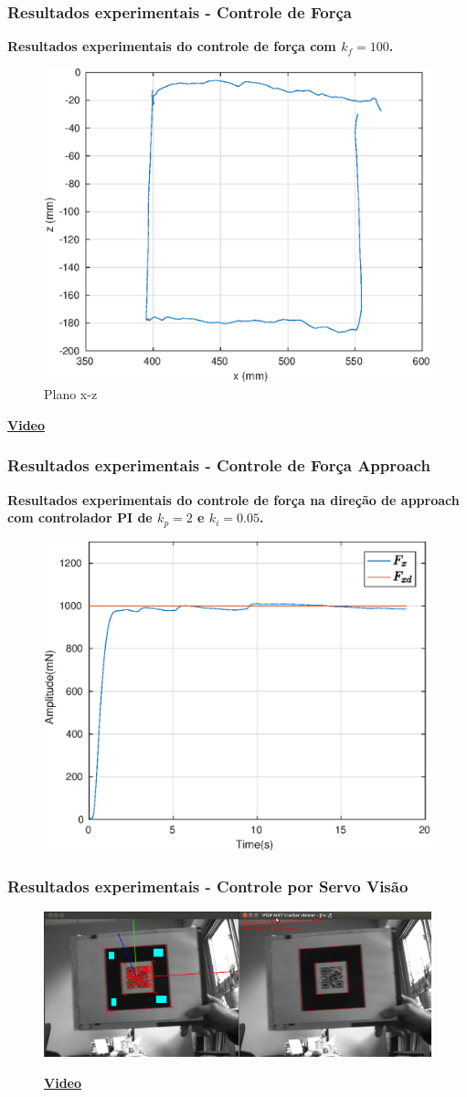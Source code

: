 \documentclass{beamer}
\begin{document}
\begin{frame}
\frametitle{Resultados experimentais - Controle de Força}
\textbf{Resultados experimentais do controle de força com $k_f = 100$.}
\begin{figure}[H]
\includegraphics[width=0.5\linewidth]{./img/float2/xz.eps}
\caption{Plano x-z}
\end{figure}%
\begin{center}
\href{run:./videos/force.mp4}{\textbf{Video}}%
\end{center}
\end{frame}

\begin{frame}
\frametitle{Resultados experimentais - Controle de Força Approach}
\textbf{Resultados experimentais do controle de força na direção de approach com controlador PI de $k_p = 2$ e $k_i = 0.05$. }
\begin{figure}[H]
\includegraphics[width=0.5\linewidth]{./img/force1000_kp2_ki005/Fx.eps}
\end{figure}%
\begin{center}
\end{center}
\end{frame}

\begin{frame}
\frametitle{Resultados experimentais - Controle por Servo Visão}
\begin{figure}[H]
\includegraphics[width=0.5\linewidth]{./img/tracker_viewer-small.png}
\begin{center}
\href{run:./videos/vision_complete.mp4}{\textbf{Video}}%
\end{center}
\end{figure}%
\end{frame}
\end{document}
